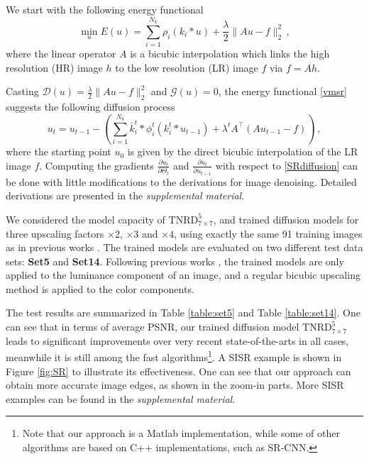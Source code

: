 \documentclass[10pt,journal,compsoc]{IEEEtran}
\newcommand{\cD}{\mathcal{D}}
\newcommand{\cG}{\mathcal{G}}
\newcommand{\suml}[2]{\sum\limits_{#1}^{#2}}
\begin{document}
We start with the following energy functional
\begin{equation}\label{vmsr}
\min\limits_{u}E(u) = 
\suml{i=1}{N_k}\rho_i(k_i * u) + \frac{\lambda}{2}\|Au - f\|_2^2\,,
\end{equation}
where the linear operator $A$ is a bicubic interpolation which 
links the high resolution (HR) image $h$ to the low resolution (LR) image $f$ via 
$f = Ah$. 
\begin{comment}
Following the widely used framework proposed in \cite{ANR}, in this paper, the LR images are produced by down scaling 
the HR images via the bicubic interpolation. 
\end{comment}
Casting $\cD(u) = \frac{\lambda}{2}\|Au - f\|^2_2$ and $\cG(u)  = 0$, 
the energy functional \eqref{vmsr} suggests the following diffusion process 
\begin{equation}\label{SRdiffusion}
u_t = u_{t-1} - \left(\sum\limits_{i = 1}^{N_k}\bar k_i^t * \phi_i^t(k_i^t * u_{t-1}) + \lambda^t A^\top (A u_{t-1} - f)
\right)\,, 
\end{equation}
where the starting point $u_0$ 
is given by the direct bicubic interpolation of the LR image $f$. 
Computing the gradients $\frac{\partial u_t}{\partial \Theta_t}$ and $\frac{\partial u_t}{\partial u_{t-1}}$ with respect to 
\eqref{SRdiffusion} can be done with little modifications to the derivations for image denoising. 
Detailed derivations are presented in the \textit{supplemental material}. 

We considered the model capacity of $\text{TNRD}_{7 \times 7}^5$, and trained diffusion models for three upscaling 
factors $\times 2$, $\times 3$ and $\times 4$, using exactly 
the same 91 training images as in previous works \cite{ANR, schulter15}. The trained models are evaluated on two 
different test data sets: \textbf{Set5} and \textbf{Set14}. Following previous works \cite{ANR, SRCNN, schulter15}, the trained 
models are only applied to the luminance component of an image, and a regular bicubic upscaling method is applied to 
the color components. 

The test results are summarized in Table \ref{table:set5} and 
Table \ref{table:set14}. One can see that in terms of average PSNR, 
our trained diffusion model $\text{TNRD}_{7 \times 7}^5$ leads to significant 
improvements over very recent state-of-the-arts in all cases, meanwhile it is still among the fast algorithms\footnote{Note that our approach is a Matlab implementation, while some of other algorithms are 
based on C++ implementations, such as SR-CNN.}. A SISR example is shown in Figure \ref{fig:SR} 
to illustrate its effectiveness. One can see that our approach can obtain more 
accurate image edges, 
as shown in the zoom-in parts. More SISR examples can be found in the \textit{supplemental material}. 
\end{document}
